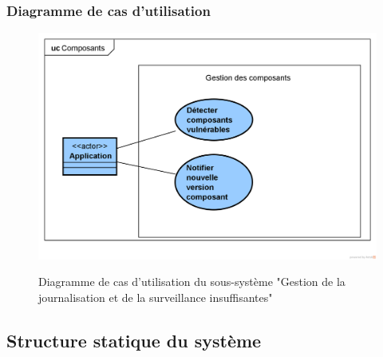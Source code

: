\subsubsection{Diagramme de cas d'utilisation}
\begin{figure}[H]
	\centering
	\begin{minipage}{12cm}
		\centering
		{\includegraphics[height=0.35\textheight, width=1\textwidth]{fig/Composants-use-case-diagram.png}}
	\end{minipage}
	\caption{Diagramme de cas d'utilisation du sous-système "Gestion de la journalisation et de la surveillance insuffisantes"}
	\label{fig:7.20}
\end{figure}
\subsection{Structure statique du système}
